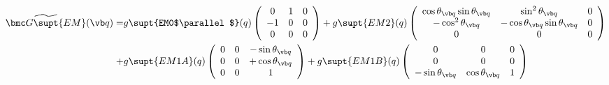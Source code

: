 \documentclass[letterpaper]{article}
\renewcommand{\wt}{\widetilde}
\begin{document}
\begin{align*}
 \wt{\bmc G\supt{EM}}(\vb q)
 = &g\supt{EM0$\parallel$}(q)
    \left(\begin{array}{ccc}
    0 & 1 & 0 \\ 
   -1 & 0 & 0 \\ 
    0 & 0 & 0 \\ 
   \end{array}\right)
  +g\supt{EM2}(q)
   \left(\begin{array}{ccc}
    \cos\theta_{\vb q} \sin\theta_{\vb q} & \sin^2\theta_{\vb q} & 0 \\
    -\cos^2\theta_{\vb q} & -\cos\theta_{\vb q} \sin\theta_{\vb q} & 0 \\
    0                     & 0                    & 0 
   \end{array}\right)
\\
  + &g\supt{EM1A}(q)
    \left(\begin{array}{ccc}
    0 & 0 & -\sin\theta_{\vb q} \\
    0 & 0 & +\cos\theta_{\vb q} \\
    0 & 0 & 1
   \end{array}\right)
  + g\supt{EM1B}(q)
    \left(\begin{array}{ccc}
    0 & 0 & 0 \\
    0 & 0 & 0 \\
   -\sin\theta_{\vb q} & \cos\theta_{\vb q} & 1
   \end{array}\right)
\end{align*}
\end{document}
